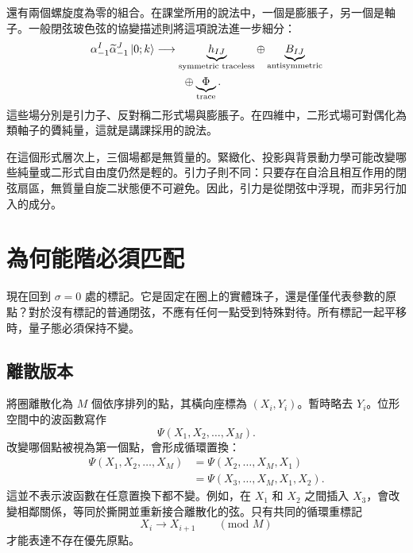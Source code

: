 還有兩個螺旋度為零的組合。在課堂所用的說法中，一個是膨脹子，另一個是軸子。一般閉弦玻色弦的協變描述則將這項說法進一步細分：
\begin{equation}
  \begin{aligned}
    \alpha_{-1}^{I}\widetilde\alpha_{-1}^{J}\left\lvert0;k\right\rangle
    &\longrightarrow
    \underbrace{h_{IJ}}_{\text{symmetric traceless}}
    \oplus
    \underbrace{B_{IJ}}_{\text{antisymmetric}}\\
    &\hspace{2.5em}\oplus
    \underbrace{\Phi}_{\text{trace}}.
  \end{aligned}
  \label{eq:l04-massless-tensor-decomposition}
\end{equation}
這些場分別是引力子、反對稱二形式場與膨脹子。在四維中，二形式場可對偶化為類軸子的贗純量，這就是講課採用的說法。

在這個形式層次上，三個場都是無質量的。緊緻化、投影與背景動力學可能改變哪些純量或二形式自由度仍然是輕的。引力子則不同：只要存在自洽且相互作用的閉弦扇區，無質量自旋二狀態便不可避免。因此，引力是從閉弦中浮現，而非另行加入的成分。

\section{為何能階必須匹配}

現在回到 \(\sigma=0\) 處的標記。它是固定在圈上的實體珠子，還是僅僅代表參數的原點？對於沒有標記的普通閉弦，不應有任何一點受到特殊對待。所有標記一起平移時，量子態必須保持不變。

\subsection{離散版本}

將圈離散化為 \(M\) 個依序排列的點，其橫向座標為 \((X_i,Y_i)\)。暫時略去 \(Y_i\)。位形空間中的波函數寫作
\begin{equation}
  \Psi(X_1,X_2,\ldots,X_M).
\end{equation}
改變哪個點被視為第一個點，會形成循環置換：
\begin{align}
  \Psi(X_1,X_2,\ldots,X_M)
  &=
  \Psi(X_2,\ldots,X_M,X_1)\nonumber\\
  &=
  \Psi(X_3,\ldots,X_M,X_1,X_2).
  \label{eq:l04-cyclic-wavefunction}
\end{align}
這並不表示波函數在任意置換下都不變。例如，在 \(X_1\) 和 \(X_2\) 之間插入 \(X_3\)，會改變相鄰關係，等同於撕開並重新接合離散化的弦。只有共同的循環重標記
\begin{equation}
  X_i\longrightarrow X_{i+1}\qquad(\text{mod }M)
  \label{eq:l04-discrete-shift}
\end{equation}
才能表達不存在優先原點。


